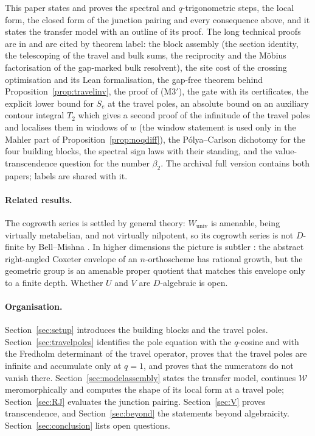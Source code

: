\documentclass[11pt]{article}
\theoremstyle{plain}
\theoremstyle{definition}
\theoremstyle{remark}
\theoremstyle{plain}\newtheorem*{maintheorem}{Main Theorem}
\begin{document}
This paper states and proves the spectral and $q$-trigonometric steps, the local form, the closed
form of the junction pairing and every consequence above, and it states the transfer model with an
outline of its proof. The long technical proofs are in \cite{Bonfioli2026bB} and are cited by
theorem label: the block assembly (the section identity, the telescoping of the travel and bulk
sums, the reciprocity and the M\"obius factorisation of the gap-marked bulk resolvent), the site
cost of the crossing optimisation and its Lean formalisation, the gap-free theorem behind
Proposition~\ref{prop:travelinv}, the proof of \textup{(M3$'$)}, the gate with its certificates, the
explicit lower bound for $S_e$ at the travel poles, an absolute bound on an auxiliary contour
integral $T_2$ which gives a second proof of the infinitude of the travel poles and localises them
in windows of $w$ \textup{(}the window statement is used only in the Mahler part of
Proposition~\ref{prop:noqdiff}\textup{)}, the
P\'olya--Carlson dichotomy for the four building blocks, the spectral sign laws with their standing,
and the value-transcendence question for the number $\beta_2$. The archival full version
\cite{Bonfioli2026b} contains both papers; labels are shared with it.

\paragraph{Related results.} The cogrowth series is settled by general theory: $W_{\mathrm{univ}}$
is amenable, being virtually metabelian, and not virtually nilpotent, so its cogrowth series is not
$D$-finite by Bell--Mishna \cite{BellMishna2020}. In higher dimensions the picture is subtler
\cite{Bonfioli2026c}: the abstract right-angled Coxeter envelope of an $n$-orthoscheme has rational
growth, but the geometric group is an amenable proper quotient that matches this envelope only to a
finite depth. Whether $U$ and $V$ are $D$-algebraic is open.

\paragraph{Organisation.} Section~\ref{sec:setup} introduces the building blocks and the travel
poles. Section~\ref{sec:travelpoles} identifies the pole equation with the $q$-cosine and with the
Fredholm determinant of the travel operator, proves that the travel poles are infinite and
accumulate only at $q=1$, and proves that the numerators do not vanish there.
Section~\ref{sec:modelassembly} states the transfer model, continues $\mathcal W$ meromorphically
and computes the shape of its local form at a travel pole; Section~\ref{sec:RJ} evaluates the
junction pairing. Section~\ref{sec:V} proves transcendence, and Section~\ref{sec:beyond} the
statements beyond algebraicity. Section~\ref{sec:conclusion} lists open questions.
\end{document}
